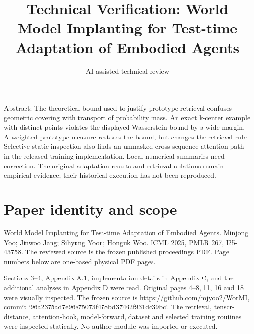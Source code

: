 \documentclass[10pt]{article}
\title{Technical Verification: World Model Implanting for Test-time Adaptation of Embodied Agents}
\author{AI-assisted technical review}
\date{}
\begin{document}
\maketitle
Abstract: The theoretical bound used to justify prototype retrieval confuses geometric covering with transport of probability mass. An exact k-center example with distinct points violates the displayed Wasserstein bound by a wide margin. A weighted prototype measure restores the bound, but changes the retrieval rule. Selective static inspection also finds an unmasked cross-sequence attention path in the released training implementation. Local numerical summaries need correction. The original adaptation results and retrieval ablations remain empirical evidence; their historical execution has not been reproduced.\par
\section*{Paper identity and scope}
World Model Implanting for Test-time Adaptation of Embodied Agents. Minjong Yoo; Jinwoo Jang; Sihyung Yoon; Honguk Woo. ICML 2025, PMLR 267, I25-43758. The reviewed source is the frozen published proceedings PDF. Page numbers below are one-based physical PDF pages.\par
Sections 3–4, Appendix A.1, implementation details in Appendix C, and the additional analyses in Appendix D were read. Original pages 4–8, 11, 16 and 18 were visually inspected. The frozen source is https://github.com/mjyoo2/WorMI, commit `96a2375ad7e96e75073f478bd37462f931dc39bc`. The retrieval, tensor-distance, attention-hook, model-forward, dataset and selected training routines were inspected statically. No author module was imported or executed.\par
\end{document}
